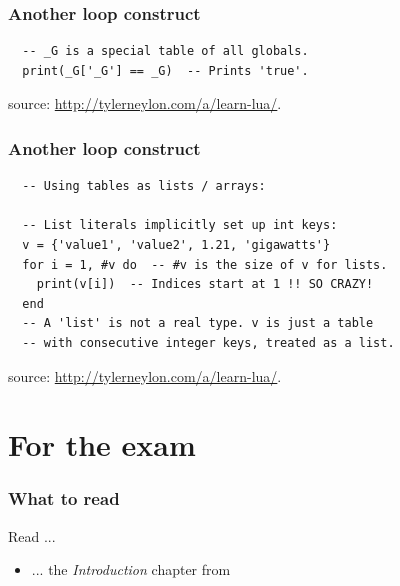 \begin{frame}[fragile]
  \frametitle{Another loop construct}
  \begin{verbatim}
  -- _G is a special table of all globals.
  print(_G['_G'] == _G)  -- Prints 'true'.
  \end{verbatim}
  \vfill
  \begin{center}
    \begin{tiny}
      source: \url{http://tylerneylon.com/a/learn-lua/}.
    \end{tiny}
  \end{center}
\end{frame}


\begin{frame}[fragile]
  \frametitle{Another loop construct}
  \begin{verbatim}
  -- Using tables as lists / arrays:

  -- List literals implicitly set up int keys:
  v = {'value1', 'value2', 1.21, 'gigawatts'}
  for i = 1, #v do  -- #v is the size of v for lists.
    print(v[i])  -- Indices start at 1 !! SO CRAZY!
  end
  -- A 'list' is not a real type. v is just a table
  -- with consecutive integer keys, treated as a list.
  \end{verbatim}
  \vfill
  \begin{center}
    \begin{tiny}
      source: \url{http://tylerneylon.com/a/learn-lua/}.
    \end{tiny}
  \end{center}
\end{frame}

\appendix

\section{For the exam}
\label{sec:readings}

\begin{frame}
  \frametitle{What to read}
  Read ...
  \begin{itemize}
  \item ... the \emph{Introduction} chapter from \cite{haykin2009neural}
  \end{itemize}
\end{frame}

